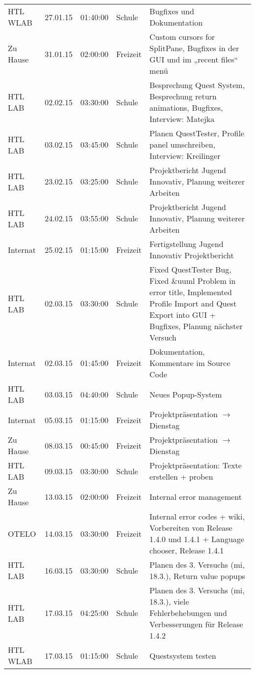 \begin{small}
\begin{longtable}{ p{} p{} p{} p{} p{}}
HTL WLAB	& 27.01.15	& 01:40:00	& Schule	& Bugfixes und Dokumentation \\
Zu Hause	& 31.01.15	& 02:00:00	& Freizeit	& Custom cursors for SplitPane, Bugfixes in der GUI und im „recent files“ men\"u \\
HTL LAB	& 02.02.15	& 03:30:00	& Schule	& Besprechung Quest System, Besprechung return animations, Bugfixes, Interview: Matejka \\
HTL LAB	& 03.02.15	& 03:45:00	& Schule	& Planen QuestTester, Profile panel umschreiben, Interview: Kreilinger \\
HTL LAB	& 23.02.15	& 03:25:00	& Schule	& Projektbericht Jugend Innovativ, Planung weiterer Arbeiten \\
HTL LAB	& 24.02.15	& 03:55:00	& Schule	& Projektbericht Jugend Innovativ, Planung weiterer Arbeiten \\
Internat	& 25.02.15	& 01:15:00	& Freizeit	& Fertigstellung Jugend Innovativ Projektbericht \\
HTL LAB	& 02.03.15	& 03:30:00	& Schule	& Fixed QuestTester Bug, Fixed \&{}uuml Problem in error title, Implemented Profile Import and Quest Export into GUI + Bugfixes, Planung n\"achster Versuch \\
Internat	& 02.03.15	& 01:45:00	& Freizeit	& Dokumentation, Kommentare im Source Code \\
HTL LAB	& 03.03.15	& 04:40:00	& Schule	& Neues Popup-System \\
Internat	& 05.03.15	& 01:15:00	& Freizeit	& Projektpr\"asentation $\rightarrow$ Dienstag \\
Zu Hause	& 08.03.15	& 00:45:00	& Freizeit	& Projektpr\"asentation $\rightarrow$ Dienstag \\
HTL LAB	& 09.03.15	& 03:30:00	& Schule	& Projektpr\"asentation: Texte erstellen + proben \\
Zu Hause	& 13.03.15	& 02:00:00	& Freizeit	& Internal error management \\
OTELO	& 14.03.15	& 03:30:00	& Freizeit	& Internal error codes + wiki, Vorbereiten von Release 1.4.0 und 1.4.1 + Language chooser, Release 1.4.1 \\
HTL LAB	& 16.03.15	& 03:30:00	& Schule	& Planen des 3. Versuchs (mi, 18.3.), Return value popups \\
HTL LAB	& 17.03.15	& 04:25:00	& Schule	& Planen des 3. Versuchs (mi, 18.3.), viele Fehlerbehebungen und Verbesserungen f\"ur Release 1.4.2 \\
HTL WLAB	& 17.03.15	& 01:15:00	& Schule	& Questsystem testen \\

\end{longtable}
\end{small}
